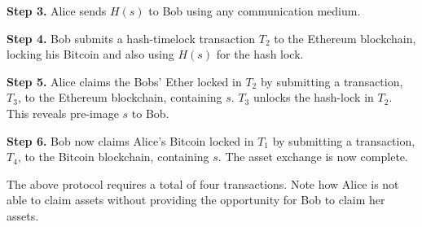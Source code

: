 \textbf{Step 3.} Alice sends $ H(s) $ to Bob using any communication medium.

\textbf{Step 4.} Bob submits a hash-timelock transaction $ T_2 $ to the Ethereum blockchain, locking his Bitcoin and also using $ H(s) $ for the hash lock.

\textbf{Step 5.} Alice claims the Bobs' Ether locked in $ T_2 $ by submitting a transaction, $ T_3 $, to the Ethereum blockchain, containing $ s $. $ T_3 $ unlocks the hash-lock in $ T_2 $. This reveals pre-image $ s $ to Bob.

\textbf{Step 6.} Bob now claims Alice's Bitcoin locked in $ T_1 $ by submitting a transaction, $ T_4 $, to the Bitcoin blockchain, containing $ s $. The asset exchange is now complete.

The above protocol requires a total of four transactions.
Note how Alice is not able to claim assets without providing the opportunity for Bob to claim her assets.


